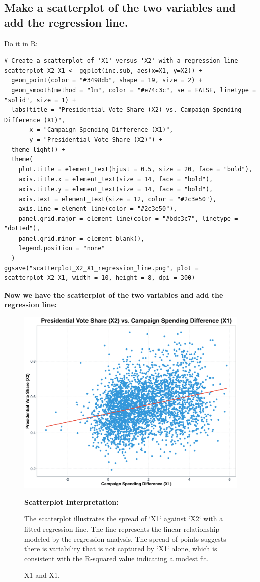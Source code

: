 \documentclass[12pt]{article}
\begin{document}
\subsection{Make a scatterplot of the two variables and add the regression line.}
Do it in R:
\begin{lstlisting}
# Create a scatterplot of 'X1' versus 'X2' with a regression line
scatterplot_X2_X1 <- ggplot(inc.sub, aes(x=X1, y=X2)) +
  geom_point(color = "#3498db", shape = 19, size = 2) +
  geom_smooth(method = "lm", color = "#e74c3c", se = FALSE, linetype = "solid", size = 1) +
  labs(title = "Presidential Vote Share (X2) vs. Campaign Spending Difference (X1)",
       x = "Campaign Spending Difference (X1)",
       y = "Presidential Vote Share (X2)") +
  theme_light() +
  theme(
    plot.title = element_text(hjust = 0.5, size = 20, face = "bold"),
    axis.title.x = element_text(size = 14, face = "bold"),
    axis.title.y = element_text(size = 14, face = "bold"),
    axis.text = element_text(size = 12, color = "#2c3e50"),
    axis.line = element_line(color = "#2c3e50"),
    panel.grid.major = element_line(color = "#bdc3c7", linetype = "dotted"),
    panel.grid.minor = element_blank(),
    legend.position = "none"
  )
ggsave("scatterplot_X2_X1_regression_line.png", plot = scatterplot_X2_X1, width = 10, height = 8, dpi = 300)

\end{lstlisting}
\textbf{Now we have the scatterplot of the two variables and add the regression line:}
\begin{figure}[h!]
    \centering
    \includegraphics[width=.75\textwidth]{scatterplot_X2_X1_regression_line.png}
    \caption{\footnotesize X1 and X1.}
    \label{fig:plot_2}
    \smallskip
    \raggedright
    \textbf{Scatterplot Interpretation:}

    The scatterplot illustrates the spread of `X1` against `X2` with a fitted regression line. The line represents the linear relationship modeled by the regression analysis. The spread of points suggests there is variability that is not captured by `X1` alone, which is consistent with the R-squared value indicating a modest fit.
\end{figure}  
\end{document}
